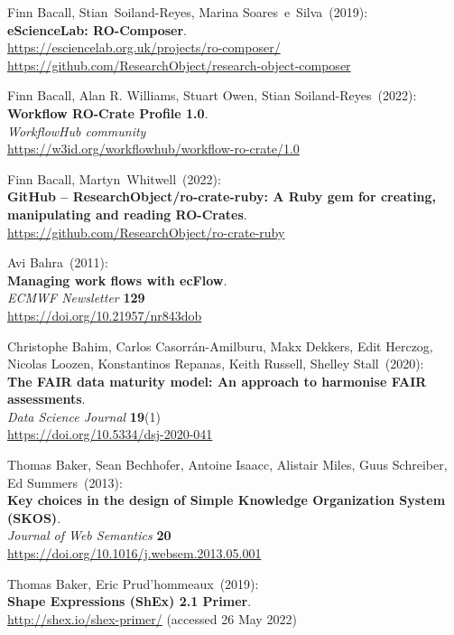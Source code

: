 \begin{thebibliography}{9}
Finn Bacall, Stian~Soiland-Reyes, Marina Soares~e~Silva~(2019): \\
\textbf{eScienceLab: RO-Composer}.\\
\url{https://esciencelab.org.uk/projects/ro-composer/}\\
\url{https://github.com/ResearchObject/research-object-composer}

Finn Bacall, Alan R. Williams, Stuart Owen, Stian
Soiland-Reyes~(2022): \\
\textbf{Workflow RO-Crate Profile 1.0}.\\
\emph{WorkflowHub community}\\
\url{https://w3id.org/workflowhub/workflow-ro-crate/1.0}

Finn Bacall, Martyn~Whitwell~(2022): \\
\textbf{GitHub -- ResearchObject/ro-crate-ruby: A Ruby gem for creating,
manipulating and reading RO-Crates}.\\
\url{https://github.com/ResearchObject/ro-crate-ruby}

Avi Bahra~(2011): \\
\textbf{Managing work flows with ecFlow}.\\
\emph{ECMWF Newsletter} \textbf{129} \\
\url{https://doi.org/10.21957/nr843dob}

Christophe Bahim, Carlos Casorrán-Amilburu, Makx Dekkers, Edit Herczog, Nicolas Loozen, Konstantinos Repanas, Keith Russell, Shelley Stall~(2020): \\
\textbf{The FAIR data maturity model: An approach to harmonise FAIR assessments}.\\
\emph{Data Science Journal} \textbf{19}(1)\\
\url{https://doi.org/10.5334/dsj-2020-041}

Thomas Baker, Sean Bechhofer, Antoine Isaacc, Alistair Miles, Guus Schreiber, Ed Summers~(2013): \\
\textbf{Key choices in the design of Simple Knowledge Organization System (SKOS)}.\\
\emph{Journal of Web Semantics} \textbf{20} \\
\url{https://doi.org/10.1016/j.websem.2013.05.001}

Thomas Baker, Eric Prud'hommeaux~(2019): \\
\textbf{Shape {Expressions} ({ShEx}) 2.1 {Primer}}. \\
\url{http://shex.io/shex-primer/} (accessed 26 May 2022)


\end{thebibliography}
